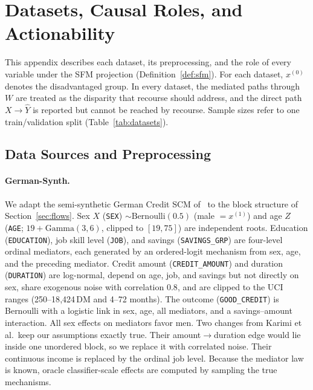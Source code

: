 \section{Datasets, Causal Roles, and Actionability}
\label{app:data}

This appendix describes each dataset, its preprocessing, and the role of
every variable under the SFM projection (Definition~\ref{def:sfm}). For each
dataset, $x^{(0)}$ denotes the disadvantaged group. In every dataset, the
mediated paths through $W$ are treated as the disparity that recourse should
address, and the direct path $X\to\hat Y$ is reported but cannot be reached
by recourse. Sample sizes refer to one train/validation split
(Table~\ref{tab:datasets}).

\subsection{Data Sources and Preprocessing}
\label{app:data_sources}

\paragraph{German-Synth.}
We adapt the semi-synthetic German Credit SCM
of~\citet{karimi2020imperfect} to the block structure of
Section~\ref{sec:flows}. Sex $X$ (\texttt{SEX}) $\sim\mathrm{Bernoulli}(0.5)$
(male $=x^{(1)}$) and age $Z$ (\texttt{AGE}; $19+\mathrm{Gamma}(3,6)$, clipped
to $[19,75]$) are independent roots. Education (\texttt{EDUCATION}), job skill
level (\texttt{JOB}), and savings (\texttt{SAVINGS\_GRP}) are four-level
ordinal mediators, each generated by an ordered-logit mechanism from sex, age,
and the preceding mediator. Credit amount (\texttt{CREDIT\_AMOUNT}) and
duration (\texttt{DURATION}) are log-normal, depend on age, job, and savings
but not directly on sex, share exogenous noise with correlation $0.8$, and are
clipped to the UCI ranges (250--18{,}424\,DM and 4--72 months). The outcome
(\texttt{GOOD\_CREDIT}) is Bernoulli with a logistic link in sex, age, all
mediators, and a savings--amount interaction. All sex effects on mediators
favor men. Two changes from Karimi et al.\ keep our assumptions exactly
true. Their amount$\to$duration edge would lie inside one unordered block, so
we replace it with correlated noise. Their continuous income is replaced by
the ordinal job level. Because the mediator law is known, oracle
classifier-scale effects are computed by sampling the true mechanisms.


